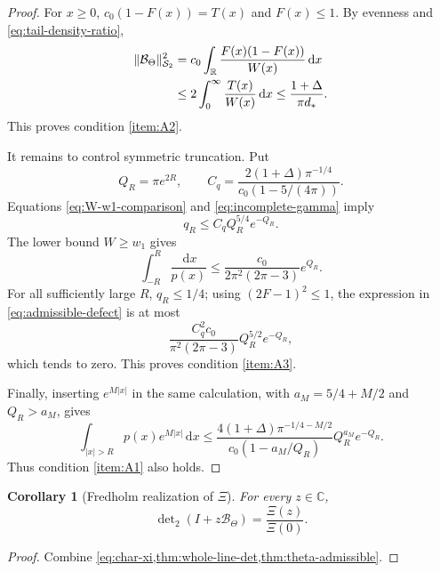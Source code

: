 \documentclass[11pt,reqno]{amsart}
\numberwithin{equation}{section}
\newtheorem{corollary}[corollary]{Corollary}
\newcommand{\C}{\mathbb C}
\newcommand{\R}{\mathbb R}
\newcommand{\1}{\mathbf 1}
\newcommand{\HS}{\mathcal S_2}
\newcommand{\BTheta}{\mathcal B_{\Theta}}
\newcommand{\dd}{\,\mathrm d}
\newcommand{\detTwo}{\det\nolimits_{2}}
\begin{document}
\begin{proof}
For $x\geq0$, $c_0(1-F(x))=T(x)$ and $F(x)\leq1$.  By evenness and
\eqref{eq:tail-density-ratio},
\begin{align}
 \|\BTheta\|_{\HS}^2
 &=c_0\int_{\R}\frac{F(x)(1-F(x))}{W(x)}\dd x\notag\\
 &\leq2\int_0^\infty\frac{T(x)}{W(x)}\dd x
 \leq\frac{1+\Delta}{\pi d_*}.
 \label{eq:theta-HS-proof}
\end{align}
This proves condition \ref{item:A2}.

It remains to control symmetric truncation.  Put
\begin{equation}\label{eq:QR-Cq}
 Q_R=\pi e^{2R},
 \qquad
 C_q=\frac{2(1+\Delta)\pi^{-1/4}}
 {c_0(1-5/(4\pi))}.
\end{equation}
Equations \eqref{eq:W-w1-comparison} and
\eqref{eq:incomplete-gamma} imply
\begin{equation}\label{eq:qR-bound}
 q_R\leq C_qQ_R^{5/4}e^{-Q_R}.
\end{equation}
The lower bound $W\geq w_1$ gives
\begin{equation}\label{eq:reciprocal-bound}
 \int_{-R}^R\frac{\dd x}{p(x)}
 \leq\frac{c_0}{2\pi^2(2\pi-3)}e^{Q_R}.
\end{equation}
For all sufficiently large $R$, $q_R\leq1/4$; using
$(2F-1)^2\leq1$, the expression in
\eqref{eq:admissible-defect} is at most
\begin{equation}\label{eq:explicit-interior-bound}
 \frac{C_q^2c_0}{\pi^2(2\pi-3)}
 Q_R^{5/2}e^{-Q_R},
\end{equation}
which tends to zero.  This proves condition \ref{item:A3}.

Finally, inserting $e^{M|x|}$ in the same calculation, with
$a_M=5/4+M/2$ and $Q_R>a_M$, gives
\begin{equation}\label{eq:exp-tail-bound}
 \int_{|x|>R}p(x)e^{M|x|}\dd x
 \leq
 \frac{4(1+\Delta)\pi^{-1/4-M/2}}
 {c_0(1-a_M/Q_R)}Q_R^{a_M}e^{-Q_R}.
\end{equation}
Thus condition \ref{item:A1} also holds.
\end{proof}

\begin{corollary}[Fredholm realization of $\Xi$]\label{cor:main-det}
For every $z\in\C$,
\begin{equation}\label{eq:main-det}
 \boxed{
 \detTwo(I+z\BTheta)=\frac{\Xi(z)}{\Xi(0)}.}
\end{equation}
\end{corollary}

\begin{proof}
Combine \cref{eq:char-xi,thm:whole-line-det,thm:theta-admissible}.
\end{proof}
\end{document}
